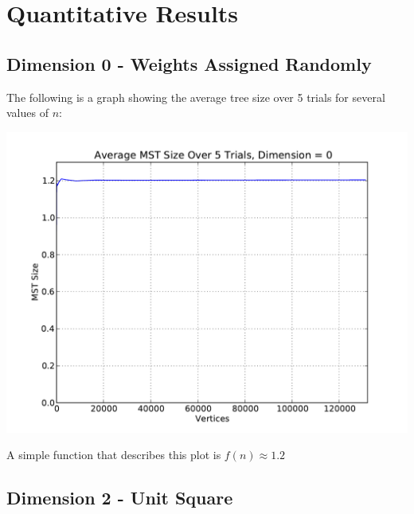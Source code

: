 \documentclass[solution, letterpaper]{cs121}
\begin{document}

\section{Quantitative Results}
\subsection*{Dimension 0 - Weights Assigned Randomly}

The following is a graph showing the average tree size over 5 trials for several values of $n$: 
\begin{center}
\includegraphics[scale=0.8]{graphs/kruskals-dimension-0.pdf}
\end{center}

A simple function that describes this plot is $f(n) \approx 1.2$

\pagebreak
\subsection*{Dimension 2 - Unit Square}
\end{document}
